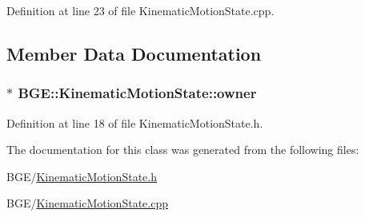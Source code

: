 Definition at line 23 of file Kinematic\-Motion\-State.\-cpp.



\subsection{Member Data Documentation}
\hypertarget{class_b_g_e_1_1_kinematic_motion_state_abe8f906a98a54663660e2aae73f0f226}{
\subsubsection[{owner}]{$\ast$ B\-G\-E\-::\-Kinematic\-Motion\-State\-::owner}}\label{class_b_g_e_1_1_kinematic_motion_state_abe8f906a98a54663660e2aae73f0f226}


Definition at line 18 of file Kinematic\-Motion\-State.\-h.



The documentation for this class was generated from the following files\-:\begin{DoxyCompactItemize}
\item 
B\-G\-E/\hyperlink{_kinematic_motion_state_8h}{Kinematic\-Motion\-State.\-h}\item 
B\-G\-E/\hyperlink{_kinematic_motion_state_8cpp}{Kinematic\-Motion\-State.\-cpp}\end{DoxyCompactItemize}
